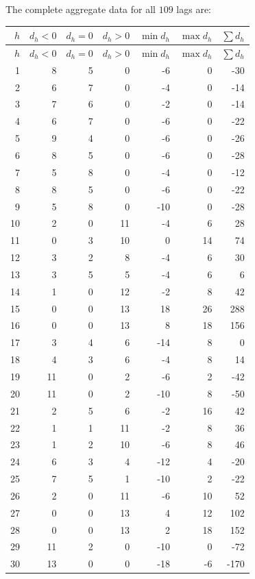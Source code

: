 \documentclass[11pt]{article}
\begin{document}
The complete aggregate data for all $109$ lags are:
\begin{center}\scriptsize
\begin{longtable}{r r r r r r r}
\toprule $h$ & $d_h<0$ & $d_h=0$ & $d_h>0$ & $\min d_h$ & $\max d_h$ & $\sum d_h$\\
\midrule\endfirsthead
\toprule $h$ & $d_h<0$ & $d_h=0$ & $d_h>0$ & $\min d_h$ & $\max d_h$ & $\sum d_h$\\
\midrule\endhead
1 & 8 & 5 & 0 & -6 & 0 & -30\\
2 & 6 & 7 & 0 & -4 & 0 & -14\\
3 & 7 & 6 & 0 & -2 & 0 & -14\\
4 & 6 & 7 & 0 & -6 & 0 & -22\\
5 & 9 & 4 & 0 & -6 & 0 & -26\\
6 & 8 & 5 & 0 & -6 & 0 & -28\\
7 & 5 & 8 & 0 & -4 & 0 & -12\\
8 & 8 & 5 & 0 & -6 & 0 & -22\\
9 & 5 & 8 & 0 & -10 & 0 & -28\\
10 & 2 & 0 & 11 & -4 & 6 & 28\\
11 & 0 & 3 & 10 & 0 & 14 & 74\\
12 & 3 & 2 & 8 & -4 & 6 & 30\\
13 & 3 & 5 & 5 & -4 & 6 & 6\\
14 & 1 & 0 & 12 & -2 & 8 & 42\\
15 & 0 & 0 & 13 & 18 & 26 & 288\\
16 & 0 & 0 & 13 & 8 & 18 & 156\\
17 & 3 & 4 & 6 & -14 & 8 & 0\\
18 & 4 & 3 & 6 & -4 & 8 & 14\\
19 & 11 & 0 & 2 & -6 & 2 & -42\\
20 & 11 & 0 & 2 & -10 & 8 & -50\\
21 & 2 & 5 & 6 & -2 & 16 & 42\\
22 & 1 & 1 & 11 & -2 & 8 & 36\\
23 & 1 & 2 & 10 & -6 & 8 & 46\\
24 & 6 & 3 & 4 & -12 & 4 & -20\\
25 & 7 & 5 & 1 & -10 & 2 & -22\\
26 & 2 & 0 & 11 & -6 & 10 & 52\\
27 & 0 & 0 & 13 & 4 & 12 & 102\\
28 & 0 & 0 & 13 & 2 & 18 & 152\\
29 & 11 & 2 & 0 & -10 & 0 & -72\\
30 & 13 & 0 & 0 & -18 & -6 & -170\\

\end{longtable}
\end{center}
\end{document}
